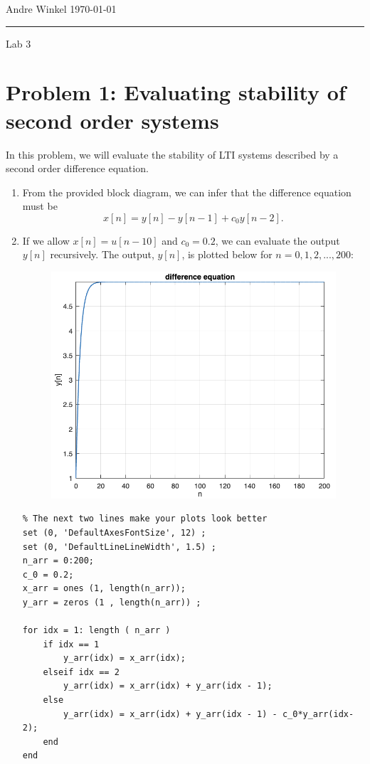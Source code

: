 \documentclass[12pt]{article}
\begin{document}
\noindent Andre Winkel \hfill \today \\
\rule{\textwidth}{0.4pt} \vspace{0em}
\begin{center} \large{Lab 3} \end{center} \vspace*{0em}

\section*{Problem 1: Evaluating stability of second order systems}
In this problem, we will evaluate the stability of LTI systems described by a second order difference equation.
\begin{enumerate}[label=\textbf{\alph*)}, leftmargin=2.6em]

\item From the provided block diagram, we can infer that the difference equation must be
\begin{equation}
    x[n]=y[n]-y[n-1]+c_0y[n-2].
\end{equation}

\item If we allow $x[n]=u[n-10]$ and $c_0=0.2$, we can evaluate the output $y[n]$ recursively. The output, $y[n]$, is plotted below for $n=0,1,2,...,200$:
\begin{figure}[H]
    \centering
    \includegraphics[width=0.5\linewidth]{plot1.png}
\end{figure}
\begin{verbatim}
% The next two lines make your plots look better
set (0, 'DefaultAxesFontSize', 12) ;
set (0, 'DefaultLineLineWidth', 1.5) ;
n_arr = 0:200;
c_0 = 0.2;
x_arr = ones (1, length(n_arr));
y_arr = zeros (1 , length(n_arr)) ;

for idx = 1: length ( n_arr )
    if idx == 1
        y_arr(idx) = x_arr(idx);
    elseif idx == 2
        y_arr(idx) = x_arr(idx) + y_arr(idx - 1);
    else
        y_arr(idx) = x_arr(idx) + y_arr(idx - 1) - c_0*y_arr(idx-2);
    end
end


\end{verbatim}
\end{enumerate}
\end{document}
